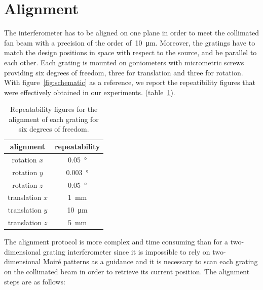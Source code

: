 \section{Alignment}
The interferometer has to be aligned on one plane in order to meet the
collimated fan beam with a precision of the order of~\SI{10}{\micro\metre}.
Moreover, the gratings have to match the design positions in space with
respect to the source, and be parallel to each other.
Each grating is mounted on goniometers with micrometric screws providing six
degrees of freedom, three for translation and three for rotation.
With figure~\ref{fig:schematic} as a reference, we report the repeatibility
figures that were effectively obtained in our experiments.
(table~\ref{tab:allineamento}).
\begin{table}[htb]
    \centering
    \begin{tabular}{*2c}
        \toprule
        alignment & repeatability\\
        \midrule
        rotation $x$ & \SI{0.05}{\degree}\\
        rotation $y$ & \SI{0.003}{\degree}\\
        rotation $z$ & \SI{0.05}{\degree}\\
        translation $x$ & \SI{1}{\milli\metre}\\
        translation $y$ & \SI{10}{\micro\metre}\\
        translation $z$ & \SI{5}{\milli\metre}\\
        \bottomrule
    \end{tabular}
    \caption{Repeatability figures for the alignment of each grating for six
    degrees of freedom.}
    \label{tab:allineamento}
\end{table}
The alignment protocol is more complex and time consuming than for a
two-dimensional grating interferometer since it is impossible to rely on
two-dimensional Moir\'e patterns as a guidance and it is necessary to scan
each grating on the collimated beam in order to retrieve its current position.
The alignment steps are as follows:

